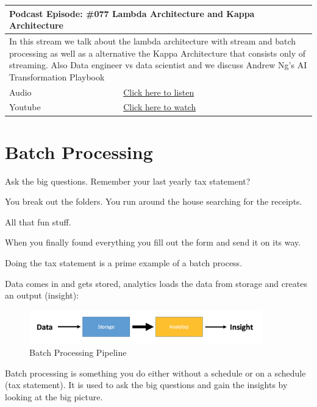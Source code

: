 \documentclass[12pt, numbers=noenddot]{scrreprt} %
\begin{document}
\begin{table}[h]
\begin{tabular}{ll}
\hline
\multicolumn{2}{l}{\textbf{Podcast Episode:} \#077 Lambda Architecture and Kappa Architecture} \\ \hline
\multicolumn{2}{p{15cm}}{In this stream we talk about the lambda architecture with stream and batch processing as well as a alternative the Kappa Architecture that consists only of streaming. Also Data engineer vs data scientist and we discuss Andrew Ng's AI Transformation Playbook}         \\ \hline
\multicolumn{1}{l|}{Audio}     & \href{https://anchor.fm/andreaskayy/episodes/077-Lambda--Kappa-Architecture-e45j0r}{Click here to listen}   \\
\multicolumn{1}{l|}{Youtube}   & \href{https://youtu.be/iUOQPyHN9-0}{Click here to watch}   \\ \hline
\end{tabular}
\end{table}


\section{Batch Processing} Ask the big questions. Remember your last yearly tax statement?

You break out the folders. You run around the house searching for the receipts.

All that fun stuff.

When you finally found everything you fill out the form and send it on its way.

Doing the tax statement is a prime example of a batch process.

Data comes in and gets stored, analytics loads the data from storage and creates an output (insight):

\begin{figure}[htbp]
  \centering
     \includegraphics[width=0.9\textwidth]{images/Simple-Batch-Processing-Workflow.png}
  \caption{Batch Processing Pipeline}
  \label{fig:Bild1}
\end{figure}

Batch processing is something you do either without a schedule or on a schedule (tax statement). It is used to ask the big questions and gain the insights by looking at the big picture.
\end{document}

